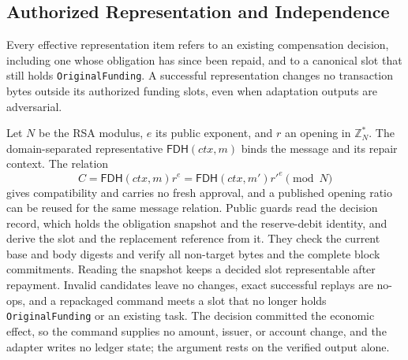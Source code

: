 \subsection{Authorized Representation and Independence}
\label{sec:security-repair}

\begin{lemma}
\label{lem:security-repair}
Every effective representation item refers to an existing compensation
decision, including one whose obligation has since been repaid, and to a
canonical slot that still holds \texttt{OriginalFunding}. A successful
representation changes no transaction bytes outside its authorized
funding slots, even when adaptation outputs are adversarial.
\end{lemma}
\begin{IEEEproof}
Let $N$ be the RSA modulus, $e$ its public exponent, and $r$ an opening in $\mathbb Z_N^*$. The domain-separated representative $\mathsf{FDH}(ctx,m)$ binds the message and its repair context. The relation
\begin{equation}
 C=\mathsf{FDH}(ctx,m)r^e=\mathsf{FDH}(ctx,m')r'^e\pmod N
\end{equation}
gives compatibility and carries no fresh approval, and a published opening ratio can be reused for the same message relation. Public guards read the decision record, which holds the obligation snapshot and the reserve-debit identity, and derive the slot and the replacement reference from it. They check the current base and body digests and verify all non-target bytes and the complete block commitments. Reading the snapshot keeps a decided slot representable after repayment. Invalid candidates leave no changes, exact successful replays are no-ops, and a repackaged command meets a slot that no longer holds \texttt{OriginalFunding} or an existing task. The decision committed the economic effect, so the command supplies no amount, issuer, or account change, and the adapter writes no ledger state; the argument rests on the verified output alone.
\end{IEEEproof}

